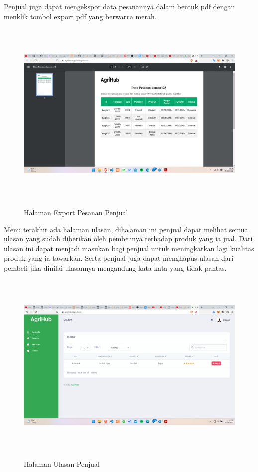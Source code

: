\begin{enumerate}
\begin{enumerate}
			\par Penjual juga dapat mengekspor data pesanannya dalam bentuk pdf dengan menklik tombol export pdf yang berwarna merah.

			\begin{figure}[H]
				\centering
				{\includegraphics [width = 14.3cm, height= 9cm]{gambar/penjual/pdf_penjual}}
				\caption{Halaman Export Pesanan Penjual}
				\label{pdf_penjual}
			\end{figure}

			\par Menu terakhir ada halaman ulasan, dihalaman ini penjual dapat melihat semua ulasan yang sudah diberikan oleh pembelinya terhadap produk yang ia jual. Dari ulasan ini dapat menjadi masukan bagi penjual untuk meningkatkan lagi kualitas produk yang ia tawarkan. Serta penjual juga dapat menghapus ulasan dari pembeli jika dinilai ulasannya mengandung kata-kata yang tidak pantas.

			\begin{figure}[H]
				\centering
				{\includegraphics [width = 14.3cm, height= 9cm]{gambar/penjual/ulasan}}
				\caption{Halaman Ulasan Penjual}
				\label{ulasan}
			\end{figure}


\end{enumerate}
\end{enumerate}

